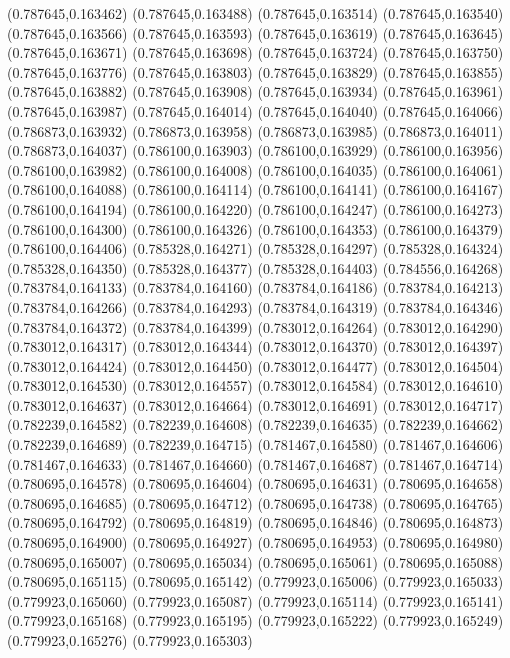 (0.787645,0.163462)
(0.787645,0.163488)
(0.787645,0.163514)
(0.787645,0.163540)
(0.787645,0.163566)
(0.787645,0.163593)
(0.787645,0.163619)
(0.787645,0.163645)
(0.787645,0.163671)
(0.787645,0.163698)
(0.787645,0.163724)
(0.787645,0.163750)
(0.787645,0.163776)
(0.787645,0.163803)
(0.787645,0.163829)
(0.787645,0.163855)
(0.787645,0.163882)
(0.787645,0.163908)
(0.787645,0.163934)
(0.787645,0.163961)
(0.787645,0.163987)
(0.787645,0.164014)
(0.787645,0.164040)
(0.787645,0.164066)
(0.786873,0.163932)
(0.786873,0.163958)
(0.786873,0.163985)
(0.786873,0.164011)
(0.786873,0.164037)
(0.786100,0.163903)
(0.786100,0.163929)
(0.786100,0.163956)
(0.786100,0.163982)
(0.786100,0.164008)
(0.786100,0.164035)
(0.786100,0.164061)
(0.786100,0.164088)
(0.786100,0.164114)
(0.786100,0.164141)
(0.786100,0.164167)
(0.786100,0.164194)
(0.786100,0.164220)
(0.786100,0.164247)
(0.786100,0.164273)
(0.786100,0.164300)
(0.786100,0.164326)
(0.786100,0.164353)
(0.786100,0.164379)
(0.786100,0.164406)
(0.785328,0.164271)
(0.785328,0.164297)
(0.785328,0.164324)
(0.785328,0.164350)
(0.785328,0.164377)
(0.785328,0.164403)
(0.784556,0.164268)
(0.783784,0.164133)
(0.783784,0.164160)
(0.783784,0.164186)
(0.783784,0.164213)
(0.783784,0.164266)
(0.783784,0.164293)
(0.783784,0.164319)
(0.783784,0.164346)
(0.783784,0.164372)
(0.783784,0.164399)
(0.783012,0.164264)
(0.783012,0.164290)
(0.783012,0.164317)
(0.783012,0.164344)
(0.783012,0.164370)
(0.783012,0.164397)
(0.783012,0.164424)
(0.783012,0.164450)
(0.783012,0.164477)
(0.783012,0.164504)
(0.783012,0.164530)
(0.783012,0.164557)
(0.783012,0.164584)
(0.783012,0.164610)
(0.783012,0.164637)
(0.783012,0.164664)
(0.783012,0.164691)
(0.783012,0.164717)
(0.782239,0.164582)
(0.782239,0.164608)
(0.782239,0.164635)
(0.782239,0.164662)
(0.782239,0.164689)
(0.782239,0.164715)
(0.781467,0.164580)
(0.781467,0.164606)
(0.781467,0.164633)
(0.781467,0.164660)
(0.781467,0.164687)
(0.781467,0.164714)
(0.780695,0.164578)
(0.780695,0.164604)
(0.780695,0.164631)
(0.780695,0.164658)
(0.780695,0.164685)
(0.780695,0.164712)
(0.780695,0.164738)
(0.780695,0.164765)
(0.780695,0.164792)
(0.780695,0.164819)
(0.780695,0.164846)
(0.780695,0.164873)
(0.780695,0.164900)
(0.780695,0.164927)
(0.780695,0.164953)
(0.780695,0.164980)
(0.780695,0.165007)
(0.780695,0.165034)
(0.780695,0.165061)
(0.780695,0.165088)
(0.780695,0.165115)
(0.780695,0.165142)
(0.779923,0.165006)
(0.779923,0.165033)
(0.779923,0.165060)
(0.779923,0.165087)
(0.779923,0.165114)
(0.779923,0.165141)
(0.779923,0.165168)
(0.779923,0.165195)
(0.779923,0.165222)
(0.779923,0.165249)
(0.779923,0.165276)
(0.779923,0.165303)
